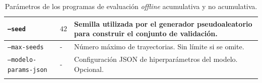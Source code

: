 \begin{longtable}[htbp]{|p{4.2cm}|p{1.8cm}|p{5.25cm}|}
    \texttt{--seed}
                       & \(42\)
                       & Semilla utilizada por el generador pseudoaleatorio para construir el conjunto de validación.                        \\
    \hline

    \texttt{--max-seeds}
                       & -
                       & Número máximo de trayectorias. Sin límite si se omite.                                                              \\
    \hline

    \texttt{--modelo-params-json}
                       & -
                       & Configuración JSON de hiperparámetros del modelo. Opcional.                                                         \\
    \hline
    \caption[Parámetros de los programas de evaluación \textit{offline}.]{Parámetros de los programas de evaluación \textit{offline} acumulativa y no acumulativa.}
    \label{tab:parametros_runners_offline}
\end{longtable}

\endgroup

\begingroup
\setlength{\tabcolsep}{5pt}
\renewcommand{\arraystretch}{1.3}


